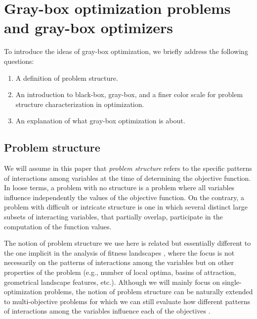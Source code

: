 \documentclass{article} %
\begin{document}
\section{Gray-box optimization problems and gray-box optimizers} \label{sec:GRAYBOX_BG}

 To introduce the ideas of gray-box optimization, we briefly address the following questions:

  \begin{enumerate}
   \item A definition of problem structure.
   \item An introduction to black-box, gray-box, and a finer color scale for problem structure characterization in optimization.
   \item An explanation of what gray-box optimization is about.
  \end{enumerate}


 \subsection{Problem structure}

 We will assume in this paper that \emph{problem structure} refers to the specific patterns of interactions among variables at the time of determining the objective function. In loose terms, a problem with no structure is a problem where all variables influence independently the values of the objective function. On the contrary, a problem with difficult or intricate structure is one in which several distinct large subsets of interacting variables, that partially overlap, participate in the computation of the function values.

 The notion of problem structure we use here is related but essentially different to the one implicit in the analysis of fitness landscapes \cite{Gallagher_and_Yuan:2006,Hernando_et_al:2017,Kerschke_et_al:2015,Mitchell_et_al:1992a}, where the focus is not necessarily on the patterns of interactions among the variables but on other  properties of the problem (e.g., number of local optima, basins of attraction, geometrical landscape features, etc.). Although we will mainly focus on single-optimization problems, the notion of problem structure can be naturally extended to multi-objective problems for which we can still evaluate how different patterns of interactions among the variables influence each of the objectives  \cite{Aguirre_and_Tanaka:2007,Karshenas_et_al:2014,Lopez_et_al:2014,Okabe_et_al:2004,Zangari_et_al:2016}. 
 
\end{document}

